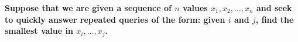 \textbf{Suppose that we are given a sequence of $n$ values $x_1, x_2, \dots, x_n$ and seek to quickly answer repeated queries of the form: given $i$ and $j$, find the smallest value in $x_i, \dots, x_j$.}\vspace{.2cm}

\textcolor{bibi}{}
\begin{quote}
\end{quote}
